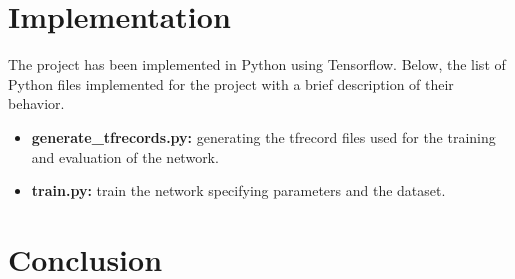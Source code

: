 \documentclass{article}
\begin{document}

\section{Implementation}

The project has been implemented in Python using Tensorflow. Below, the list of Python files implemented for the project with a brief description of their behavior.

\begin{itemize}
    \item \textbf{generate\_tfrecords.py:} generating the tfrecord files used for the training and evaluation of the network.
    \item \textbf{train.py:} train the network specifying parameters and the dataset.
\end{itemize}


\section{Conclusion}



\clearpage



\end{document}
